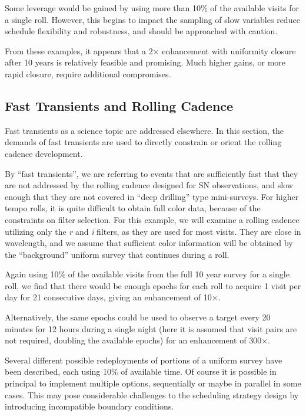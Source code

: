 Some leverage would be gained by using more than 10\% of the available
visits for a single roll.  However, this begins to impact the sampling
of slow variables reduce schedule flexibility and robustness, and should
be approached with caution.

From these examples, it appears that a 2$\times$ enhancement with
uniformity closure after 10 years is relatively feasible and promising.
Much higher gains, or more rapid closure, require additional
compromises.


\subsection{Fast Transients and Rolling Cadence}
\label{sec:rolling:transients}

Fast transients as a science topic are addressed elsewhere. In this
section, the demands of fast transients are used to directly constrain
or orient the rolling cadence development.

By ``fast transients'', we are referring to events that are sufficiently
fast that they are not addressed by the rolling cadence designed for SN
observations, and slow enough that they are not covered in ``deep
drilling'' type mini-surveys.  For higher tempo rolls, it is quite
difficult to obtain full color data, because of the constraints on
filter selection.  For this example, we will examine a rolling cadence
utilizing only the {\it r} and {\it i} filters, as they are used for
most visits. They are close in wavelength, and we assume that sufficient
color information will be obtained by the ``background'' uniform survey
that continues during a roll.

Again using 10\% of the available visits from the full 10 year survey
for a single roll, we find that there would be enough epochs for each
roll to acquire 1 visit per day for 21 consecutive days, giving an
enhancement of 10$\times$.

Alternatively, the same epochs could be used to observe a target every
20 minutes for 12 hours during a single night (here it is assumed that
visit pairs are not required, doubling the available epochs) for an
enhancement of 300$\times$.

Several different possible redeployments of portions of a uniform survey
have been described, each using 10\% of available time.  Of course it is
possible in principal to implement multiple options, sequentially or
maybe in parallel in some cases. This may pose considerable challenges
to the scheduling strategy design by introducing incompatible boundary
conditions.

